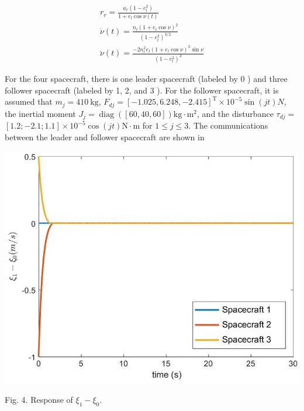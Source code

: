 \documentclass[10pt]{article}
\begin{document}
$$
\begin{gathered}
r_{r}=\frac{a_{r}\left(1-e_{l}^{2}\right)}{1+e_{l} \cos \nu(t)} \\
\dot{\nu}(t)=\frac{n_{l}\left(1+e_{l} \cos \nu\right)^{2}}{\left(1-e_{l}^{2}\right)^{3 / 2}} \\
\ddot{\nu}(t)=\frac{-2 n_{l}^{2} e_{l}\left(1+e_{l} \cos \nu\right)^{3} \sin \nu}{\left(1-e_{l}^{2}\right)^{3}}
\end{gathered}
$$

For the four spacecraft, there is one leader spacecraft (labeled by 0 ) and three follower spacecraft (labeled by 1, 2, and 3 ). For the follower spacecraft, it is assumed that $m_{j}=410 \mathrm{~kg}$, $F_{d j}=[-1.025,6.248,-2.415]^{\mathrm{T}} \times 10^{-5} \sin (j t) N$, the inertial moment $J_{j}=\operatorname{diag}([60,40,60]) \mathrm{kg} \cdot \mathrm{m}^{2}$, and the disturbance $\tau_{d j}=$ $[1.2 ;-2.1 ; 1.1] \times 10^{-5} \cos (j t) \mathrm{N} \cdot \mathrm{m}$ for $1 \leq j \leq 3$. The communications between the leader and follower spacecraft are shown in

\begin{center}
\includegraphics[max width=\textwidth]{2023_10_07_a50fd94fd281fe9896c1g-07(3)}
\end{center}

Fig. 4. Response of $\xi_{1}-\xi_{0}$.
\end{document}
